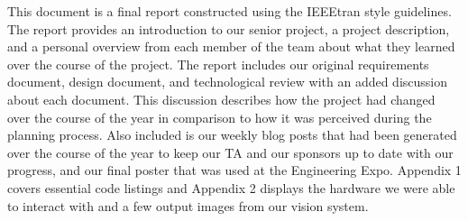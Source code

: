 This document is a final report constructed using the IEEEtran style guidelines. The report provides an introduction to our senior project, a project description, and a personal overview from each member of the team about what they learned over the course of the project. The report includes our original requirements document, design document, and technological review with an added discussion about each document. This discussion describes how the project had changed over the course of the year in comparison to how it was perceived during the planning process. Also included is our weekly blog posts that had been generated over the course of the year to keep our TA and our sponsors up to date with our progress, and our final poster that was used at the Engineering Expo. Appendix 1 covers essential code listings and Appendix 2 displays the hardware we were able to interact with and a few output images from our vision system. 
